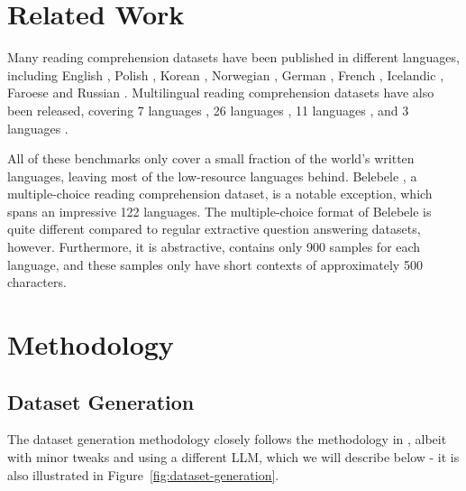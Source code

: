 \documentclass[10pt, a4paper]{article}
\begin{document}
\section{Related Work}

Many reading comprehension datasets have been published in different languages, including English , Polish , Korean , Norwegian , German , French , Icelandic , Faroese  and Russian . Multilingual reading comprehension datasets have also been released, covering 7 languages , 26 languages , 11 languages , and 3 languages .

All of these benchmarks only cover a small fraction of the world's written languages, leaving most of the low-resource languages behind. Belebele , a multiple-choice reading comprehension dataset, is a notable exception, which spans an impressive 122 languages. The multiple-choice format of Belebele is quite different compared to regular extractive question answering datasets, however. Furthermore, it is abstractive, contains only 900 samples for each language, and these samples only have short contexts of approximately 500 characters.


\section{Methodology}
\label{sec:methodology}


\subsection{Dataset Generation}
\label{sec:dataset-generation}

The dataset generation methodology closely follows the methodology in , albeit with minor tweaks and using a different LLM, which we will describe below - it is also illustrated in Figure~\ref{fig:dataset-generation}.
\end{document}
